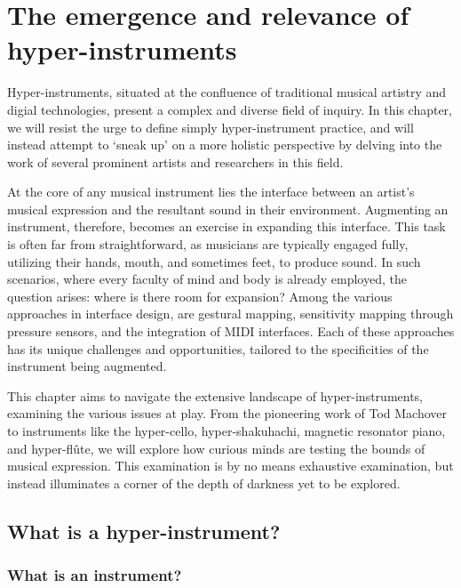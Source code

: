 \documentclass[12pt,twoside,maitrise]{dms_ks}
\theoremstyle{definition}
\begin{document}
{%


\chapter{The emergence and relevance of hyper-instruments}

Hyper-instruments, situated at the confluence of traditional musical artistry and digial technologies, present a complex and diverse field of inquiry.
In this chapter, we will resist the urge to define simply hyper-instrument practice, and will instead attempt to `sneak up' on a more holistic perspective by delving into the work of several prominent artists and researchers in this field.

At the core of any musical instrument lies the interface between an artist's musical expression and the resultant sound in their environment.
Augmenting an instrument, therefore, becomes an exercise in expanding this interface.
This task is often far from straightforward, as musicians are typically engaged fully, utilizing their hands, mouth, and sometimes feet, to produce sound.
In such scenarios, where every faculty of mind and body is already employed, the question arises: where is there room for expansion?
Among the various approaches in interface design, are gestural mapping, sensitivity mapping through pressure sensors, and the integration of MIDI interfaces.
Each of these approaches has its unique challenges and opportunities, tailored to the specificities of the instrument being augmented.

This chapter aims to navigate the extensive landscape of hyper-instruments, examining the various issues at play.
From the pioneering work of Tod Machover to instruments like the hyper-cello, hyper-shakuhachi, magnetic resonator piano, and hyper-flûte, we will explore how curious minds are testing the bounds of musical expression.
This examination is by no means exhaustive examination, but instead illuminates a corner of the depth of darkness yet to be explored. 

\section{What is a hyper-instrument?}

\subsection{What is an instrument?}

}
\end{document}
